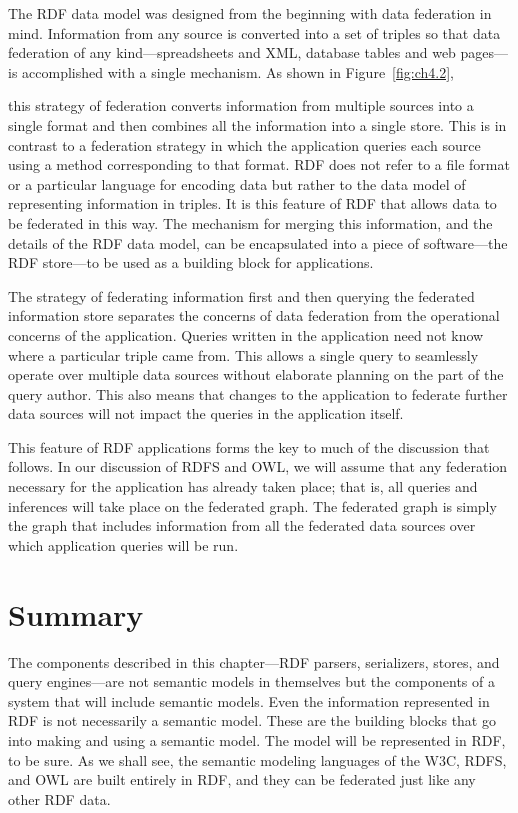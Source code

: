The RDF data model was designed from the beginning with data federation
in mind. Information from any source is converted into a set of triples
so that data federation of any kind---spreadsheets and XML, database
tables and web pages---is accomplished with a single mechanism. As shown
in Figure~\ref{fig:ch4.2},

this strategy of federation converts information from multiple sources
into a single format and then combines all the information into a single
store. This is in contrast to a federation strategy in which the
application queries each source using a method corresponding to that
format. RDF does not refer to a file format or a particular language for
encoding data but rather to the data model of representing information
in triples. It is this feature of RDF that allows data to be federated
in this way. The mechanism for merging this information, and the details
of the RDF data model, can be encapsulated into a piece of
software---the RDF store---to be used as a building block for
applications.

The strategy of federating information first and then querying the
federated information store separates the concerns of data federation
from the operational concerns of the application. Queries written in the
application need not know where a particular triple came from. This
allows a single query to seamlessly operate over multiple data sources
without elaborate planning on the part of the query author. This also
means that changes to the application to federate further data sources
will not impact the queries in the application itself.

This feature of RDF applications forms the key to much of the discussion
that follows. In our discussion of RDFS and OWL, we will assume that any
federation necessary for the application has already taken place; that
is, all queries and inferences will take place on the federated graph.
The federated graph is simply the graph that includes information from
all the federated data sources over which application queries will be
run.

\section{Summary}

The components described in this chapter---RDF parsers, serializers,
stores, and query engines---are not semantic models in themselves but
the components of a system that will include semantic models. Even the
information represented in RDF is not necessarily a semantic model.
These are the building blocks that go into making and using a semantic
model. The model will be represented in RDF, to be sure. As we shall
see, the semantic modeling languages of the W3C, RDFS, and OWL are built
entirely in RDF, and they can be federated just like any other RDF data.

